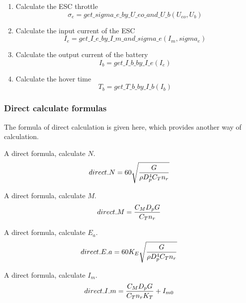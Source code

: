 \documentclass{article} %
\numberwithin{equation}{section} %
\newcommand{\SL}{\rule{.3em}{.3pt}} %
\begin{document}
\begin{enumerate}
\item Calculate the ESC throttle
\begin{equation*}
\sigma_e = get\_ sigma\_ e\_ by\_ U\_ eo\_ and\_ U\_ b (U_{eo}, U_b) \label{q_hover.sigma_e}
\end{equation*}

\item Calculate the input current of the ESC
\begin{equation*}
I_e = get\_ I\_ e\_ by\_ I\_ m\_ and\_ sigma\_ e (I_m, sigma_e) \label{q_hover.I_e}
\end{equation*}

\item Calculate the output current of the battery
\begin{equation*}
I_b = get\_ I\_ b\_ by\_ I\_ e (I_e) \label{q_hover.I_b}
\end{equation*}

\item Calculate the hover time
\begin{equation*}
T_b = get\_ T\_ b\_ by\_ I\_ b (I_b) \label{q_hover.T_b}
\end{equation*}

\end{enumerate}


\subsubsection{Direct calculate formulas}
The formula of direct calculation is given here, which provides another way of calculation.

A direct formula, calculate ${N}$.
\begin{equation}
direct\SL N = 60 \sqrt{\frac {G} {\rho D_p^4 C_T n_r}} \label{q_hover.direct_N}
\end{equation}

A direct formula, calculate ${M}$.
\begin{equation}
direct\SL M = \frac{C_M D_p G}{C_T n_r} \label{q_hover.direct_M}
\end{equation}

A direct formula, calculate ${E_a}$.
\begin{equation}
direct\SL E\SL a = 60 K_{E} \sqrt{\frac {G} {\rho D_p^4 C_T n_r}} \label{q_hover.direct_E_a}
\end{equation}

A direct formula, calculate ${I_m}$.
\begin{equation}
direct\SL I\SL m = \frac{C_M D_p G}{C_T n_r K_T} + {I_{m0}} \label{q_hover.direct_I_m}
\end{equation}
\end{document}

